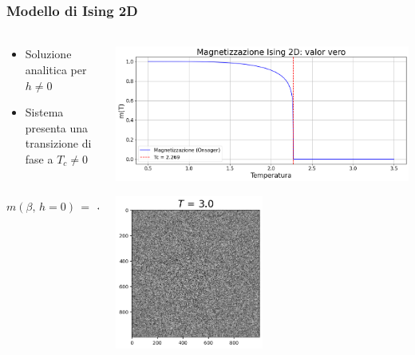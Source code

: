 \begin{frame}
    \frametitle{Modello di Ising 2D}
    \framesubtitle{}

    \begin{columns}

        \begin{column}{0.55\textwidth}

			\begin{itemize}[itemsep=0.5em, label=$\diamond$]
                \item Soluzione analitica per $h \neq 0$
                \item Sistema presenta una transizione di fase a $T_c \neq 0$
            \end{itemize}

			\begin{equation*}
				m\left(\beta,\,h=0\right)\,=\,
				\begin{cases}
				\left[1\,-\,\dfrac{1}{\sinh^4{\left(2\beta J\right)}}\right]^{\frac{1}{8}}\,\, T\,<\,T_c \\
				0 \qquad \qquad \qquad \qquad \,\,\,\, T\,>\,T_c
				\end{cases}
				\label{eq: magn_Ising2D_AS}
			\end{equation*}

        \end{column}


        \begin{column}{0.45\textwidth}
			
			\centering
            \includegraphics[width=\textwidth]{Immagini/Introduzione/magn_Ising2D.png}
			
			\centering
            \includegraphics[width=0.5\textwidth]{Immagini/Introduzione/cg_1000_3.0.png}


\end{column}
\end{columns}
\end{frame}
